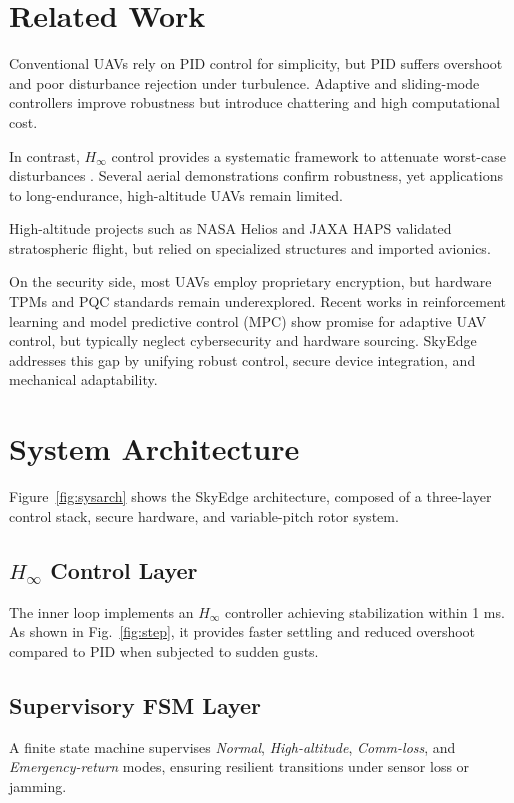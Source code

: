 \documentclass[conference]{IEEEtran}
\begin{document}
\section{Related Work}
Conventional UAVs rely on PID control for simplicity, but 
PID suffers overshoot and poor disturbance rejection under turbulence.  
Adaptive and sliding-mode controllers improve robustness but 
introduce chattering and high computational cost.  

In contrast, $H_\infty$ control provides a systematic framework to 
attenuate worst-case disturbances \cite{zhou1996robust}.  
Several aerial demonstrations confirm robustness, yet applications to 
long-endurance, high-altitude UAVs remain limited.  

High-altitude projects such as NASA Helios \cite{nasahelios} and 
JAXA HAPS \cite{jaxaHAPS} validated stratospheric flight, but 
relied on specialized structures and imported avionics.  

On the security side, most UAVs employ proprietary encryption, 
but hardware TPMs and PQC standards \cite{pqcrypto2022} remain 
underexplored. Recent works in reinforcement learning and 
model predictive control (MPC) show promise for adaptive UAV 
control, but typically neglect cybersecurity and hardware sourcing.  
SkyEdge addresses this gap by unifying robust control, secure 
device integration, and mechanical adaptability.

\section{System Architecture}
Figure~\ref{fig:sysarch} shows the SkyEdge architecture, 
composed of a three-layer control stack, secure hardware, and 
variable-pitch rotor system.  

\subsection{$H_\infty$ Control Layer}
The inner loop implements an $H_\infty$ controller achieving 
stabilization within 1 ms. As shown in Fig.~\ref{fig:step}, it 
provides faster settling and reduced overshoot compared to PID 
when subjected to sudden gusts.  

\subsection{Supervisory FSM Layer}
A finite state machine supervises \emph{Normal}, \emph{High-altitude}, 
\emph{Comm-loss}, and \emph{Emergency-return} modes, ensuring 
resilient transitions under sensor loss or jamming.  
\end{document}
